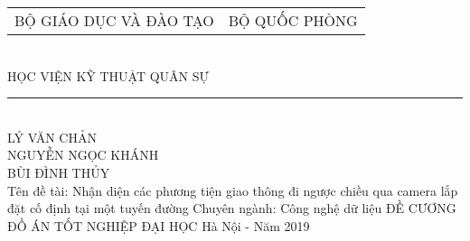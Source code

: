 \begin{center}
\vfill
\begin{tabular*}{0.8\linewidth}{@{\extracolsep{\fill}}cc}
	\large BỘ GIÁO DỤC VÀ ĐÀO TẠO  & \large BỘ QUỐC PHÒNG \\
\end{tabular*}
\\
\large HỌC VIỆN KỸ THUẬT QUÂN SỰ
\\
\rule{200px}{1px}\\


\vfill
{\LARGE
	LÝ VĂN CHẢN \\
	NGUYỄN NGỌC KHÁNH \\
	BÙI ĐÌNH THỦY\\
}
\bigbreak
Tên đề tài: Nhận diện các phương tiện giao thông đi ngược chiều qua camera lắp đặt cố định tại một tuyến đường
\bigbreak
Chuyên ngành: Công nghệ dữ liệu
\bigbreak
\LARGE
ĐỀ CƯƠNG ĐỒ ÁN TỐT NGHIỆP ĐẠI HỌC 
\bigbreak
\vfill
Hà Nội - Năm 2019
\end{center}

\thispagestyle{empty}